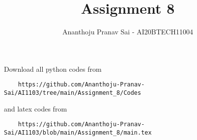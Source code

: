 \documentclass[journal,12pt,twocolumn]{IEEEtran}
\DeclareMathOperator*{\Res}{Res}
\begin{document}
\newcommand{\BEQA}{\begin{eqnarray}}
\newcommand{\EEQA}{\end{eqnarray}}
\newcommand{\define}{\stackrel{\triangle}{=}}

\raggedbottom
\setlength{\parindent}{0pt}
\providecommand{\mbf}{\mathbf}
\providecommand{\pr}[1]{\ensuremath{\Pr\left(#1\right)}}
\providecommand{\qfunc}[1]{\ensuremath{Q\left(#1\right)}}
\providecommand{\sbrak}[1]{\ensuremath{{}\left[#1\right]}}
\providecommand{\lsbrak}[1]{\ensuremath{{}\left[#1\right.}}
\providecommand{\rsbrak}[1]{\ensuremath{{}\left.#1\right]}}
\providecommand{\brak}[1]{\ensuremath{\left(#1\right)}}
\providecommand{\lbrak}[1]{\ensuremath{\left(#1\right.}}
\providecommand{\rbrak}[1]{\ensuremath{\left.#1\right)}}
\providecommand{\cbrak}[1]{\ensuremath{\left\{#1\right\}}}
\providecommand{\lcbrak}[1]{\ensuremath{\left\{#1\right.}}
\providecommand{\rcbrak}[1]{\ensuremath{\left.#1\right\}}}
\theoremstyle{remark}
\newtheorem{rem}{Remark}
\newcommand{\sgn}{\mathop{\mathrm{sgn}}}
\providecommand{\abs}[1]{\vert#1\vert}
\providecommand{\res}[1]{\Res\displaylimits_{#1}} 
\providecommand{\norm}[1]{\lVert#1\rVert}
\providecommand{\mtx}[1]{\mathbf{#1}}
\providecommand{\mean}[1]{E[ #1 ]}
\providecommand{\fourier}{\overset{\mathcal{F}}{ \rightleftharpoons}}
\providecommand{\system}{\overset{\mathcal{H}}{ \longleftrightarrow}}
\newcommand{\solution}{\noindent \textbf{Solution: }}
\newcommand{\cosec}{\,\text{cosec}\,}
\providecommand{\dec}[2]{\ensuremath{\overset{#1}{\underset{#2}{\gtrless}}}}
\newcommand{\myvec}[1]{\ensuremath{\begin{pmatrix}#1\end{pmatrix}}}
\newcommand{\mydet}[1]{\ensuremath{\begin{vmatrix}#1\end{vmatrix}}}
\makeatletter
{}
\makeatother
\let\StandardTheFigure\thefigure
\let\vec\mathbf
\renewcommand{\thefigure}{\theproblem}
\def\putbox#1#2#3{\makebox[0in][l]{\makebox[#1][l]{}\raisebox{\baselineskip}[0in][0in]{\raisebox{#2}[0in][0in]{#3}}}}
     \def\rightbox#1{\makebox[0in][r]{#1}}
     \def\centbox#1{\makebox[0in]{#1}}
     \def\topbox#1{\raisebox{-\baselineskip}[0in][0in]{#1}}
     \def\midbox#1{\raisebox{-0.5\baselineskip}[0in][0in]{#1}}
\vspace{3cm}
\title{Assignment 8}
\author{Ananthoju Pranav Sai - AI20BTECH11004}
\maketitle
\newpage
\bigskip
\renewcommand{\thefigure}{\theenumi}
\renewcommand{\thetable}{\theenumi}
Download all python codes from 
\begin{lstlisting}
    https://github.com/Ananthoju-Pranav-Sai/AI1103/tree/main/Assignment_8/Codes
\end{lstlisting}
%
and latex codes from 
%
\begin{lstlisting}
    https://github.com/Ananthoju-Pranav-Sai/AI1103/blob/main/Assignment_8/main.tex
\end{lstlisting}
\end{document}
